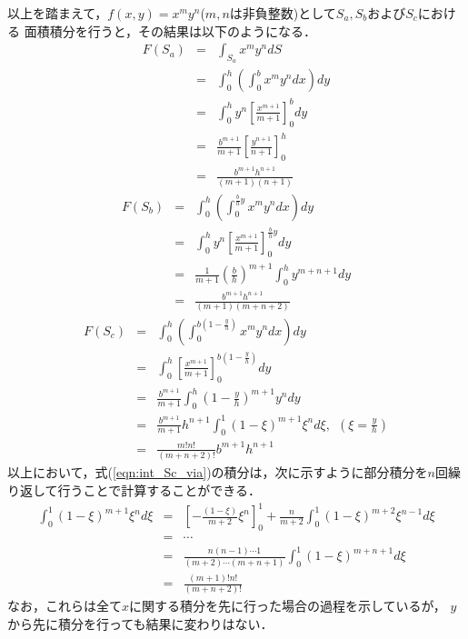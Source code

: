 \documentclass[10pt,a4j]{jbook}
\begin{document}
以上を踏まえて，$f(x,y)=x^my^n$($m,n$は非負整数)として$S_a, S_b$および$S_c$における
面積積分を行うと，その結果は以下のようになる．
\begin{eqnarray}
	F(S_a) &= & 
	\int_{S_a}x^my^ndS \nonumber \\
	&= & 
	\int_0^h \left( \int_0^b x^m y^n dx \right) dy \nonumber \\
	&= & 
	\int_0^h y^n \left[ \frac{x^{m+1}}{m+1} \right]_0^b dy \nonumber \\
	&= & 
	\frac{b^{m+1}}{m+1}
	\left[
		\frac{y^{n+1}}{n+1}
	\right]_0^h
	\nonumber
	\\
	&= & 
	\frac{ b^{m+1} h^{n+1}}{(m+1)(n+1)}
	\label{eqn:int_Sa_xmyn}
\end{eqnarray}
\begin{eqnarray}
	F(S_b) 
	&= & 
	\int_0^h \left(\int_0^{\frac{b}{h}y} x^my^ndx \right) dy
	\nonumber
	\\
	&= & 
	\int_0^h y^n \left[\frac{x^{m+1}}{m+1}\right]_0^{\frac{b}{h}y}dy 
	\nonumber
	\\
	&= & 
	\frac{1}{m+1}\left(\frac{b}{h}\right)^{m+1} \int_0^h y^{m+n+1}dy 
	\nonumber
	\\
	&= & 
	\frac{b^{m+1}h^{n+1}}{(m+1)(m+n+2)}
	\label{eqn:int_Sb_xmyn}
\end{eqnarray}
\begin{eqnarray}
	F(S_c)&= & 
	\int_0^h \left(\int_0^{b\left( 1-\frac{y}{h}\right) } x^my^ndx \right) dy
	\nonumber
	\\
	&=&
	\int_0^h \left[ \frac{x^{m+1}}{m+1}\right]_0^{b\left(1-\frac{y}{h}\right)} dy \nonumber
	\\
	&=&
	\frac{b^{m+1}}{m+1} \int_0^h \left( 1-\frac{y}{h} \right)^{m+1} y^n dy 
	\nonumber
	\\
	&=&
	\frac{b^{m+1}}{m+1}h^{n+1} \int_0^1 \left( 1-\xi \right)^{m+1} \xi^n d\xi, \ \ \left(\xi=\frac{y}{h}\right) 
	\label{eqn:int_Sc_via}
	\\
	&=&
	\frac{m!n!}{(m+n+2)!}b^{m+1}h^{n+1}
	\label{eqn:int_Sc_xmyn}
\end{eqnarray}
以上において，式(\ref{eqn:int_Sc_via})の積分は，次に示すように部分積分を$n$回繰り返して行うことで計算することができる．
\begin{eqnarray}
	\int_0^1 \left( 1-\xi \right)^{m+1} \xi^n d\xi
	&=&
	\left[-\frac{(1-\xi)}{m+2}\xi^n\right]_0^1 + \frac{n}{m+2}\int_0^1 (1-\xi)^{m+2}\xi^{n-1}d\xi
	\nonumber
	\\
	&=&
	\cdots
	\nonumber
	\\
	&=&
	\frac{n(n-1)\cdots 1}{(m+2)\cdots (m+n+1)} \int_0^1 (1-\xi)^{m+n+1}d\xi 
	\nonumber
	\\
	&=&
	\frac{(m+1)! n!}{(m+n+2)!}
	\label{eqn:int_by_part}
\end{eqnarray}
なお，これらは全て$x$に関する積分を先に行った場合の過程を示しているが，
$y$から先に積分を行っても結果に変わりはない．
\end{document}

